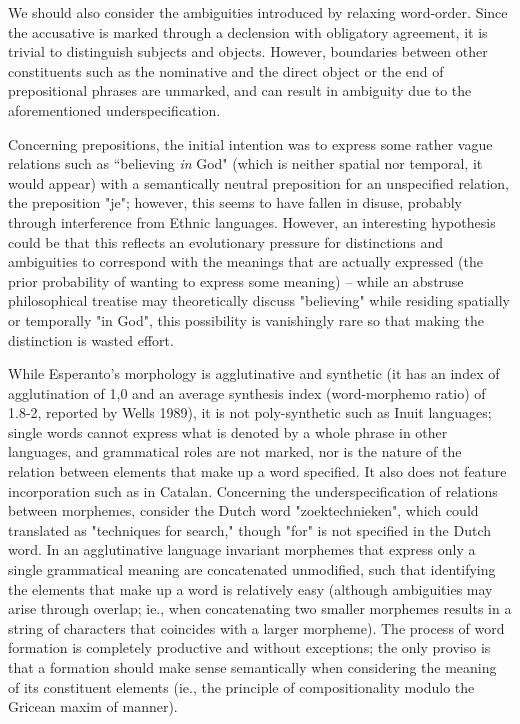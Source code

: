 \documentclass[10pt,a4paper]{article}
\begin{document}
We should also consider the ambiguities introduced by relaxing word-order.
Since the accusative is marked through a declension with obligatory agreement,
it is trivial to distinguish subjects and objects. However, boundaries between
other constituents such as the nominative and the direct object or the end of
prepositional phrases are unmarked, and can result in ambiguity due to the
aforementioned underspecification.

Concerning prepositions, the initial intention was to express some rather vague
relations such as ``believing {\em in} God" (which is neither spatial nor
temporal, it would appear) with a semantically neutral preposition for an
unspecified relation, the preposition "je"; however, this seems to have fallen
in disuse, probably through interference from Ethnic languages. However, an
interesting hypothesis could be that this reflects an evolutionary pressure for
distinctions and ambiguities to correspond with the meanings that are actually
expressed (the prior probability of wanting to express some meaning) -- while
an abstruse philosophical treatise may theoretically discuss "believing" while
residing spatially or temporally "in God", this possibility is vanishingly rare
so that making the distinction is wasted effort.

While Esperanto's morphology is agglutinative and synthetic (it has an index of
agglutination of 1,0 and an average synthesis index (word-morphemo ratio) of
1.8-2, reported by Wells 1989), it is not poly-synthetic such as Inuit
languages; single words cannot express what is denoted by a whole phrase
in other languages, and grammatical roles are not marked, nor is the nature of
the relation between elements that make up a word specified. It also does not
feature incorporation such as in Catalan. Concerning the underspecification of
relations between morphemes, consider the Dutch word "zoektechnieken", which
could translated as "techniques for search," though "for" is not specified in
the Dutch word. In an agglutinative language invariant morphemes that express
only a single grammatical meaning are concatenated unmodified, such that
identifying the elements that make up a word is relatively easy (although
ambiguities may arise through overlap; ie., when concatenating two smaller
morphemes results in a string of characters that coincides with a larger
morpheme). The process of word formation is completely productive and without
exceptions; the only proviso is that a formation should make sense
semantically when considering the meaning of its constituent elements (ie.,
the principle of compositionality modulo the Gricean maxim of manner). 
\end{document}
